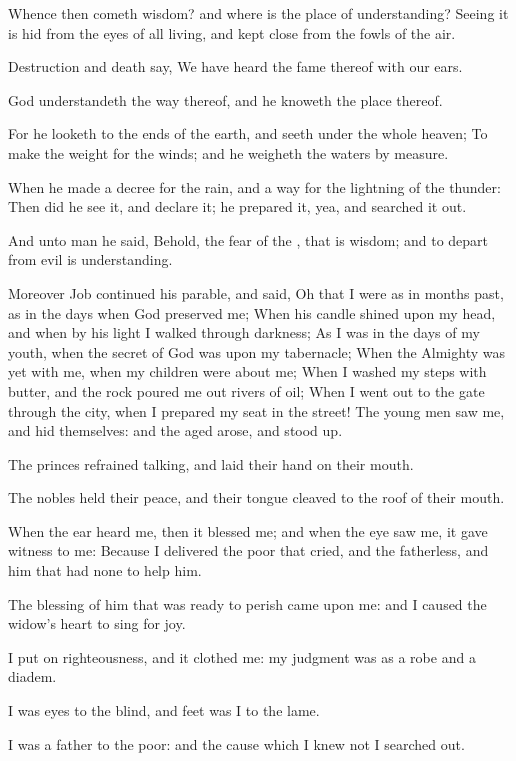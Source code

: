 \Verse Whence then cometh wisdom? and where is the place of understanding?  \Verse Seeing it is hid from the eyes of all living, and kept close from the fowls of the air.

\Verse Destruction and death say, We have heard the fame thereof with our ears.

\Verse God understandeth the way thereof, and he knoweth the place thereof.

\Verse For he looketh to the ends of the earth, and seeth under the whole heaven; \Verse To make the weight for the winds; and he weigheth the waters by measure.

\Verse When he made a decree for the rain, and a way for the lightning of the thunder: \Verse Then did he see it, and declare it; he prepared it, yea, and searched it out.

\Verse And unto man he said, Behold, the fear of the \LORD, that is wisdom; and to depart from evil is understanding.


\Chapter
\Verse Moreover Job continued his parable, and said, \Verse Oh that I were as in months past, as in the days when God preserved me; \Verse When his candle shined upon my head, and when by his light I walked through darkness; \Verse As I was in the days of my youth, when the secret of God was upon my tabernacle; \Verse When the Almighty was yet with me, when my children were about me; \Verse When I washed my steps with butter, and the rock poured me out rivers of oil; \Verse When I went out to the gate through the city, when I prepared my seat in the street!  \Verse The young men saw me, and hid themselves: and the aged arose, and stood up.

\Verse The princes refrained talking, and laid their hand on their mouth.

\Verse The nobles held their peace, and their tongue cleaved to the roof of their mouth.

\Verse When the ear heard me, then it blessed me; and when the eye saw me, it gave witness to me: \Verse Because I delivered the poor that cried, and the fatherless, and him that had none to help him.

\Verse The blessing of him that was ready to perish came upon me: and I caused the widow's heart to sing for joy.

\Verse I put on righteousness, and it clothed me: my judgment was as a robe and a diadem.

\Verse I was eyes to the blind, and feet was I to the lame.

\Verse I was a father to the poor: and the cause which I knew not I searched out.

